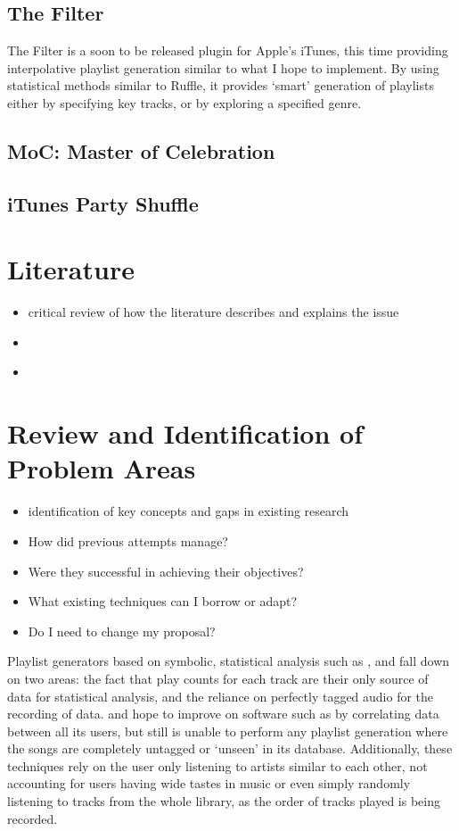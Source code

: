 \subsection{The Filter}
The Filter is a soon to be released plugin for Apple's iTunes, this time providing interpolative playlist generation similar to what I hope to implement. By using statistical methods similar to Ruffle, it provides `smart' generation of playlists either by specifying key tracks, or by exploring a specified genre.
\subsection{MoC: Master of Celebration}
\subsection{iTunes Party Shuffle}
\section{Literature}
\begin{itemize}
	\item critical review of how the literature describes and explains the issue
\end{itemize}
\begin{itemize}
	\item \citet*{Aucouturier2002,Aucouturier2002a,Aucouturier2003}
	\item \citet*{Logan2002}
\end{itemize}
\section{Review and Identification of Problem Areas}
\begin{itemize}
	\item identification of key concepts and gaps in existing research
\end{itemize}
\begin{itemize}
	\item How did previous attempts manage?
	\item Were they successful in achieving their objectives?
	\item What existing techniques can I borrow or adapt?
	\item Do I need to change my proposal?
\end{itemize}
Playlist generators based on symbolic, statistical analysis such as ,  and  fall down on two areas: the fact that play counts for each track are their only source of data for statistical analysis, and the reliance on perfectly tagged audio for the recording of data.  and  hope to improve on software such as  by correlating data between all its users, but still is unable to perform any playlist generation where the songs are completely untagged or `unseen' in its database. Additionally, these techniques rely on the user only listening to artists similar to each other, not accounting for users having wide tastes in music or even simply randomly listening to tracks from the whole library, as the order of tracks played is being recorded.

